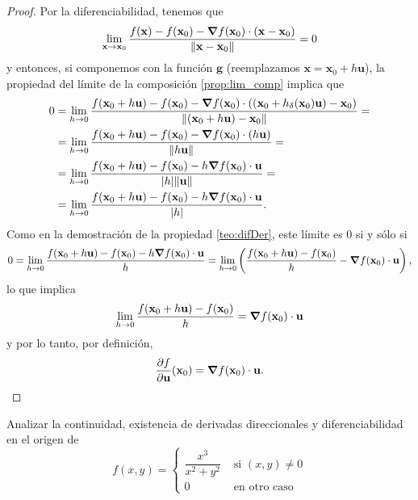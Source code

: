 \begin{theorem}
\begin{proof}
Por la diferenciabilidad, tenemos que 
\[
 \lim_{\mathbf{x} \to \mathbf{x}_0} \frac{f(\mathbf{x}) - f(\mathbf{x}_0) - \grad f (\mathbf{x}_0) \cdot (\mathbf{x} - \mathbf{x}_0)}
                                 {\norm{\mathbf{x} - \mathbf{x}_0}} = 0
\]
y entonces, si componemos con la funci\'on $\mathbf{g}$ (reemplazamos $\mathbf{x} = \mathbf{x}_0 + h {\mathbf{u}}$), la propiedad del l\'imite de la composici\'on \eqref{prop:lim_comp} implica que
\begin{align*}
  0 & = \lim_{h \to 0} \frac{f(\mathbf{x}_0 + h {\mathbf{u}}) - f(\mathbf{x}_0) - \grad f (\mathbf{x}_0) \cdot ((\mathbf{x}_0 + h _{\delta}(\mathbf{x}_0){\mathbf{u}}) - \mathbf{x}_0) }
                    {\norm{(\mathbf{x}_0 + h {\mathbf{u}}) - \mathbf{x}_0}} = \\
    & = \lim_{h \to 0} \frac{f(\mathbf{x}_0 + h {\mathbf{u}}) - f(\mathbf{x}_0) - \grad f (\mathbf{x}_0) \cdot (h {\mathbf{u}}) }
                    {\norm{h {\mathbf{u}}}} = \\
    & = \lim_{h \to 0} \frac{f(\mathbf{x}_0 + h {\mathbf{u}}) - f(\mathbf{x}_0) - h \grad f (\mathbf{x}_0) \cdot {\mathbf{u}} }
                    {\abs{h} \norm{{\mathbf{u}}}} = \\
    & = \lim_{h \to 0} \frac{f(\mathbf{x}_0 + h {\mathbf{u}}) - f(\mathbf{x}_0) - h \grad f (\mathbf{x}_0) \cdot {\mathbf{u}} }
                    {\abs{h}}.  
\end{align*}                                
Como en la demostraci\'on de la propiedad \eqref{teo:difDer}, este l\'imite es $0$ si y s\'olo si
\[
 0 = \lim_{h \to 0} \frac{f(\mathbf{x}_0 + h {\mathbf{u}}) - f(\mathbf{x}_0) - h \grad f (\mathbf{x}_0) \cdot {\mathbf{u}}}{h} = 
     \lim_{h \to 0} \left( \frac{f(\mathbf{x}_0 + h {\mathbf{u}}) - f(\mathbf{x}_0)}{h} - \grad f (\mathbf{x}_0) \cdot {\mathbf{u}} \right),
\]
lo que implica 
\[
 \lim_{h \to 0} \frac{f(\mathbf{x}_0 + h {\mathbf{u}}) - f(\mathbf{x}_0)}{h} = \grad f (\mathbf{x}_0) \cdot {\mathbf{u}}
\]
y por lo tanto, por definici\'on,
\[
 \frac{\partial f}{\partial {\mathbf{u}}} (\mathbf{x}_0) = \grad f (\mathbf{x}_0) \cdot {\mathbf{u}}.
\]
 \end{proof}
\end{theorem}


\begin{tarea} Analizar la continuidad, existencia de derivadas direccionales y  diferenciabilidad  en el origen de
 \[
        f(x,y) = 
        \begin{cases}
         \dfrac{x^{3}}{x^{2} +y^{2} } & \text{ si }  (x, y)  \neq  0  \\
         0 & \text{ en otro caso }
        \end{cases}
\]
\end{tarea}

